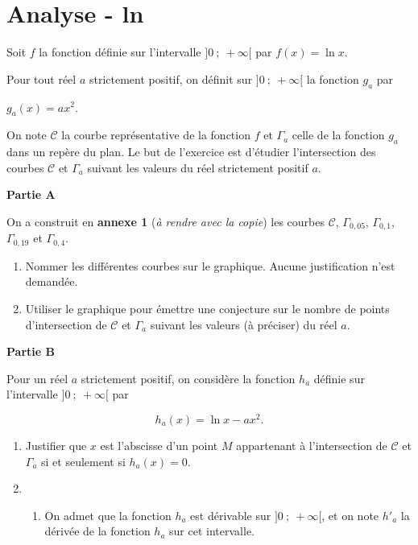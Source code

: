 \documentclass{cornouaille}
\begin{document}
\tableofcontents

\section{Analyse - ln}

\begin{exercice}


Soit $f$ la fonction définie sur l'intervalle $]0~;~+ \infty[$ par $f(x) = \ln x$.

Pour tout réel $a$ strictement positif, on définit sur $]0~;~+ \infty[$ la fonction $g_a$ par 

$g_a(x) = ax^2$.

On note $\mathcal{C}$ la courbe représentative de la fonction $f$ et $\Gamma_a$ celle de la fonction $g_a$ dans un repère du plan. Le but de l'exercice est d'étudier l'intersection des courbes $\mathcal{C}$ et $\Gamma_a$ suivant les valeurs du réel strictement positif $a$.

\bigskip

\textbf{Partie A}

\medskip

On a construit en \textbf{annexe 1} (\emph{à rendre avec la copie}) les courbes $\mathcal{C}$, $\Gamma_{0,05}$, $\Gamma_{0,1}$, $\Gamma_{0,19}$ et $\Gamma_{0,4}$.

\medskip

\begin{enumerate}
\item Nommer les différentes courbes sur le graphique. Aucune justification n'est demandée.
\item Utiliser le graphique pour émettre une conjecture sur le nombre de points d'intersection de
$\mathcal{C}$ et $\Gamma_a$ suivant les valeurs (à préciser) du réel $a$.
\end{enumerate}
 
\bigskip
 
\textbf{Partie B}

\medskip

Pour un réel $a$ strictement positif, on considère la fonction $h_a$ définie sur l'intervalle $]0~;~+ \infty[$ par

\[h_a(x) = \ln x - ax^2.\]

\begin{enumerate}
\item Justifier que $x$ est l'abscisse d'un point $M$ appartenant à l'intersection de $\mathcal{C}$ et $\Gamma_a$ si et seulement si $h_a (x) = 0.$
\item 
	\begin{enumerate}
		\item On admet que la fonction $h_a$ est dérivable sur $]0~;~+ \infty[$, et on note $h'_a$ la dérivée de la fonction $h_a$ sur cet intervalle.


\end{enumerate}
\end{enumerate}
\end{exercice}
\end{document}
